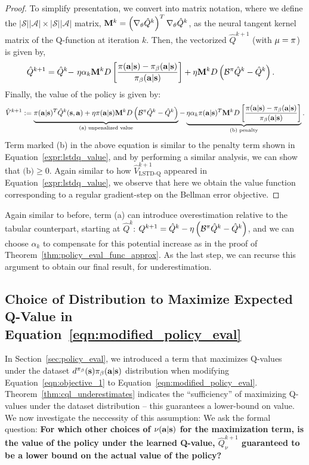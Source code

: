 \begin{proof}
To simplify presentation, we convert into matrix notation, where we define the $|\mathcal{S}||\mathcal{A}| \times |\mathcal{S}||\mathcal{A}|$ matrix, $\mathbf{M}^k = \left(\nabla_\theta \hat{Q}^k\right)^T \nabla_\theta \hat{Q}^k$, as the neural tangent kernel matrix of the Q-function at iteration $k$. Then, the vectorized $\hat{Q}^{k+1}$ (with $\mu = \pi$) is given by,
\begin{align*}
    \hat{Q}^{k+1} = \hat{Q}^{k} -&~ \eta \alpha_k \mathbf{M}^k D \left[ \frac{\pi(\mathbf{a}|\mathbf{s}) - {\pi_\beta}(\mathbf{a}|\mathbf{s})}{{\pi_\beta}(\mathbf{a}|\mathbf{s})} \right] + \eta \mathbf{M}^k D \left(\mathcal{B}^\pi \hat{Q}^k - \hat{Q}^k \right).
\end{align*}
Finally, the value of the policy is given by:
\begin{equation}
    \hat{V}^{k+1} := \underbrace{\pi(\mathbf{a}|\mathbf{s})^T \hat{Q}^k(\mathbf{s}, \mathbf{a}) + \eta \pi(\mathbf{a}|\mathbf{s}) \mathbf{M}^k D \left(\mathcal{B}^\pi \hat{Q}^k - \hat{Q}^k \right)}_{\text{(a) unpenalized value}} - \underbrace{\eta \alpha_k \pi(\mathbf{a}|\mathbf{s})^T \mathbf{M}^k D \left[ \frac{\pi(\mathbf{a}|\mathbf{s}) - {\pi_\beta}(\mathbf{a}|\mathbf{s})}{{\pi_\beta}(\mathbf{a}|\mathbf{s})} \right]}_{\text{(b) penalty}}.
\end{equation}
Term marked (b) in the above equation is similar to the penalty term shown in Equation~\ref{expr:lstdq_value}, and by performing a similar analysis, we can show that $\text{(b)} \geq 0$. Again similar to how $\hat{V}^{k+1}_\text{LSTD-Q}$ appeared in Equation~\ref{expr:lstdq_value}, we observe that here we obtain the value function corresponding to a regular gradient-step on the Bellman error objective. 
\end{proof}

Again similar to before, term (a) can introduce overestimation relative to the tabular counterpart, starting at $\hat{Q}^k$: $Q^{k+1} = \hat{Q}^k - \eta \left(\mathcal{B}^\pi \hat{Q}^k - \hat{Q}^k \right)$, and we can choose $\alpha_k$ to compensate for this potential increase as in the proof of Theorem~\ref{thm:policy_eval_func_approx}. As the last step, we can recurse this argument to obtain our final result, for underestimation.


\subsection{Choice of Distribution to Maximize Expected Q-Value in Equation~\ref{eqn:modified_policy_eval}}
\label{app:maximizing_distributions}

In Section~\ref{sec:policy_eval}, we introduced a term that maximizes Q-values under the dataset $d^{\pi_\beta}(\mathbf{s}) {\pi_\beta}(\mathbf{a}|\mathbf{s})$ distribution when modifying Equation~\ref{eqn:objective_1} to Equation~\ref{eqn:modified_policy_eval}. Theorem~\ref{thm:cql_underestimates} indicates the ``sufficiency'' of maximizing Q-values under the dataset distribution -- this guarantees a lower-bound on value. We now investigate the neccessity of this assumption: We ask the formal question: \textbf{For which other choices of $\nu(\mathbf{a}|\mathbf{s})$ for the maximization term, is the value of the policy under the learned Q-value, $\hat{Q}^{k+1}_\nu$ guaranteed to be a lower bound on the actual value of the policy?}

